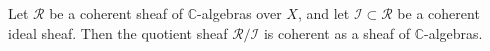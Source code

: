 Let $\mathcal{R}$ be a coherent sheaf of $\mathbb{C}$-algebras over $X$, and let $\mathcal{I} \subset \mathcal{R}$ be a coherent ideal sheaf. Then the quotient sheaf $\mathcal{R}/\mathcal{I}$ is coherent as a sheaf of $\mathbb{C}$-algebras.
